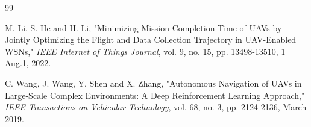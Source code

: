 \documentclass[journal]{IEEEtran}
\begin{document}
\begin{thebibliography}{99}
        
     M. Li, S. He and H. Li, "Minimizing Mission Completion Time of UAVs by Jointly Optimizing the Flight and Data Collection Trajectory in UAV-Enabled WSNs," \textit{IEEE Internet of Things Journal}, vol. 9, no. 15, pp. 13498-13510, 1 Aug.1, 2022.
        
    
        
     C. Wang, J. Wang, Y. Shen and X. Zhang, "Autonomous Navigation of UAVs in Large-Scale Complex Environments: A Deep Reinforcement Learning Approach," \textit{IEEE Transactions on Vehicular Technology}, vol. 68, no. 3, pp. 2124-2136, March 2019. 

\end{thebibliography}
\end{document}
